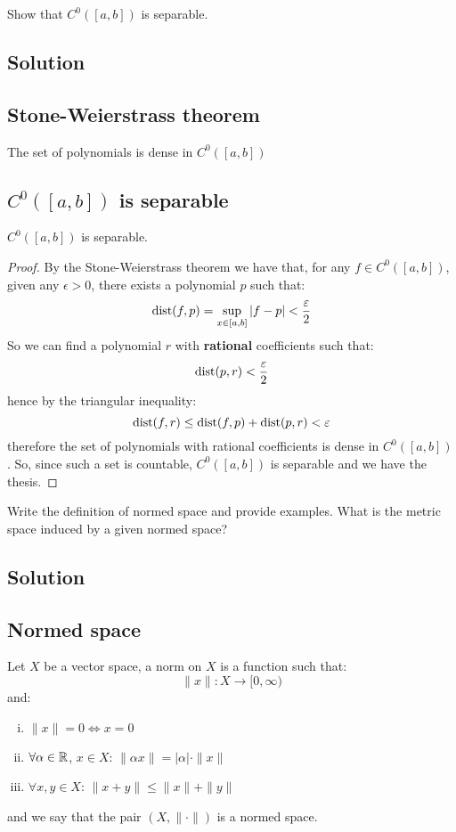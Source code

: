 \sheet


\question
Show that $C^0([a, b])$ is separable.

\subsection*{Solution}

\subsection{Stone-Weierstrass theorem}
The set of polynomials is dense in $C^0([a,b])$

\subsection{\texorpdfstring{$C^0([a,b])$}{C0} is separable}
$C^0([a,b])$ is separable.

\begin{proof}
    By the Stone-Weierstrass theorem we have that, for any $f\in C^0([a,b])$, given any $\epsilon > 0$, there exists a polynomial $p$ such that:
    \[ \operatorname*{dist}(f,p)=\sup_{x\in [a,b]} |f-p| < \frac{\varepsilon}{2} \]
    So we can find a polynomial $r$ with \textbf{rational} coefficients such that:
    \[ \operatorname*{dist}(p,r)<\frac{\varepsilon}{2}\]  
    hence by the triangular inequality:
    \[ \operatorname*{dist}(f,r) \leq \operatorname*{dist}(f,p) + \operatorname*{dist}(p,r) < \varepsilon \]
    therefore the set of polynomials with rational coefficients is dense in $C^0([a,b])$. So, since such a set is countable, $C^0([a,b])$ is separable and we have the thesis.
\end{proof}


\question
Write the definition of normed space and provide examples. What is the metric space induced by a given normed space?

\subsection*{Solution}

\subsection{Normed space}
Let $X$ be a vector space, a norm on $X$ is a function such that:
\[ \|x\| : X \to [0, \infty) \]
and:
\begin{enumerate}[i)]
    \item $\|x\|=0 \iff x=0$
    \item $\forall \alpha \in \mathbb{R}$, $x \in X$: $\|\alpha x\| = |\alpha| \cdot \|x\|$
    \item $\forall x,y \in X$: $\|x+y\| \leq \|x\| + \|y\|$ 
\end{enumerate} 
and we say that the pair $(X, \| \cdot \|)$ is a normed space.

